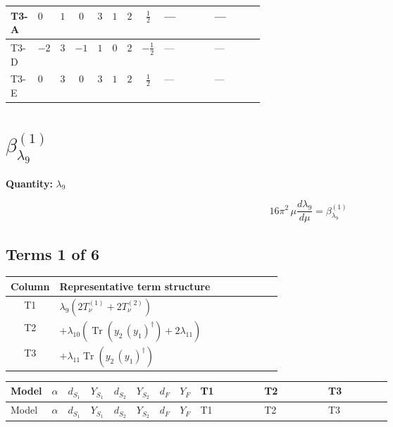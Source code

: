\documentclass[8pt]{article}
\begin{document}
\begin{landscape}
\begin{longtable}{@{}llcccccc >{\raggedright\arraybackslash}p{0.21\linewidth} >{\raggedright\arraybackslash}p{0.21\linewidth}@{}}
\midrule
T3-A & $0$ & $1$ & $0$ & $3$ & $1$ & $2$ & $\frac{1}{2}$ & --- & --- \\
\midrule
T3-D & $-2$ & $3$ & $-1$ & $1$ & $0$ & $2$ & $-\frac{1}{2}$ & --- & --- \\
\midrule
T3-E & $0$ & $3$ & $0$ & $3$ & $1$ & $2$ & $\frac{1}{2}$ & --- & --- \\
\midrule
\bottomrule
\end{longtable}
\clearpage
\section*{$\beta_{\lambda_{9}}^{(1)}$}
\noindent\textbf{Quantity: }$\lambda_{9}$\par\smallskip
\[16\pi^2\,\mu\frac{d \lambda_{9}}{d\mu}=\beta_{\lambda_{9}}^{(1)}\]
\subsection*{Terms 1 of 6}
\begin{center}
\begin{tabular}{@{}c >{\raggedright\arraybackslash}p{0.82\linewidth}@{}}
\toprule
Column & Representative term structure \\
\midrule
T1 & \(\displaystyle {\lambda_{9}} (2 T_{\nu}^{(1)}+2 T_{\nu}^{(2)})\) \\
\midrule
T2 & \(\displaystyle +{\lambda_{10}} (\operatorname{Tr}\!\left({y_2}\,\left({y_1}\right)^{\dagger}\right)+2 {\lambda_{11}})\) \\
\midrule
T3 & \(\displaystyle +{\lambda_{11}} \operatorname{Tr}\!\left({y_2}\,\left({y_1}\right)^{\dagger}\right)\) \\
\midrule
\bottomrule
\end{tabular}
\end{center}
\smallskip
\tiny
\begin{longtable}{@{}llcccccc >{\raggedright\arraybackslash}p{0.21\linewidth} >{\raggedright\arraybackslash}p{0.21\linewidth} >{\raggedright\arraybackslash}p{0.21\linewidth}@{}}
\toprule
Model & $\alpha$ & $d_{S_1}$ & $Y_{S_1}$ & $d_{S_2}$ & $Y_{S_2}$ & $d_F$ & $Y_F$ & T1 & T2 & T3 \\
\midrule
\endfirsthead
\toprule
Model & $\alpha$ & $d_{S_1}$ & $Y_{S_1}$ & $d_{S_2}$ & $Y_{S_2}$ & $d_F$ & $Y_F$ & T1 & T2 & T3 \\
\midrule
\endhead

\end{longtable}
\end{landscape}
\end{document}
